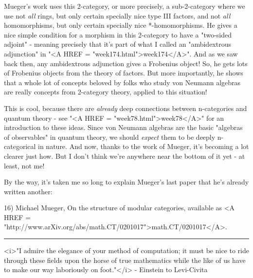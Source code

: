 Mueger's work uses this 2-category, or more precisely, a sub-2-category
where we use not \emph{all} rings, but only certain specially nice type III 
factors, and not \emph{all} homomorphisms, but only certain specially nice
*-homomorphisms.  He gives a nice simple condition for a morphism in
this 2-category to have a "two-sided adjoint" - meaning precisely 
that it's part of what I called an "ambidextrous adjunction" 
in "<A HREF = "week174.html">week174</A>".
And as we saw back then, any ambidextrous adjunction gives a Frobenius
object!  So, he gets lots of Frobenius objects from the theory of factors.  
But more importantly, he shows that a whole lot of concepts beloved by
folks who study von Neumann algebras are really concepts from 2-category
theory, applied to this situation! 

This is cool, because there are \emph{already} deep connections between 
n-categories and quantum theory - see "<A HREF = "week78.html">week78</A>" for an introduction 
to these ideas.  Since von Neumann algebras are the basic "algebras
of observables" in quantum theory, we should \emph{expect} 
them to be deeply 
n-categorical in nature.  And now, thanks to the work of Mueger, it's 
becoming a lot clearer just how.  But I don't think we're anywhere 
near the bottom of it yet - at least, not me!

By the way, it's taken me so long to explain Mueger's last paper that
he's already written another:

16) Michael Mueger, On the structure of modular categories, available
as <A HREF = "http://www.arXiv.org/abs/math.CT/0201017">math.CT/0201017</A>.




\par\noindent\rule{\textwidth}{0.4pt}
<i>"I admire the elegance of your method of computation; it must be nice to ride through these fields upon the horse of true mathematics while the like of us have to make our way laboriously on foot."</i> - Einstein to Levi-Civita 


